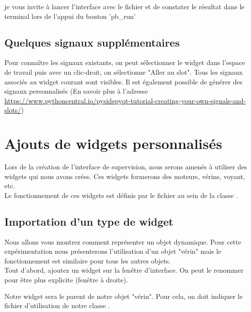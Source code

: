 \documentclass[12pt]{report}    %
\begin{document}
je vous invite à lancer l'interface avec le fichier  et de constater le résultat dans le terminal lors de l'appui du bouton 'pb\_run'
\section{Quelques signaux supplémentaires}

Pour connaître les signaux existants, on peut sélectionner le widget dans l'espace de travail puis avec un clic-droit, on sélectionne "Aller au slot". \newline
Tous les signaux associés au widget courant sont visibles.
Il est également possible de générer des signaux personnalisés (En savoir plus à l'adresse \url{https://www.pythoncentral.io/pysidepyqt-tutorial-creating-your-own-signals-and-slots/})



\chapter{Ajouts de widgets personnalisés}

Lors de la création de l'interface de supervision, nous serons amenés à utiliser des widgets qui nous avons crées. \newline
Ces widgets formerons des moteurs, vérins, voyant, etc. \\
Le fonctionnement de ces widgets est définis par le fichier  au sein de la classe .

\section{Importation d'un type de widget}

Nous allons vous montrez comment représenter un objet dynamique. Pour cette expérimentation nous présenterons l'utilisation d'un objet "vérin" mais le fonctionnement est similaire pour tous les autres objets.\\

Tout d'abord, ajoutez un widget sur la fenêtre d'interface.
On peut le renommer pour être plus explicite (fenêtre à droite).

Notre widget sera le parent de notre objet "vérin". Pour cela, on doit indiquer le fichier d'utilisation de notre classe .
\end{document}
